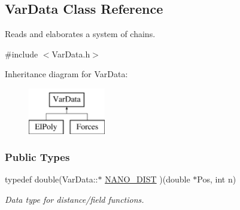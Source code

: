\hypertarget{classVarData}{\subsection{\-Var\-Data \-Class \-Reference}
\label{classVarData}
}


\-Reads and elaborates a system of chains.  




{\ttfamily \#include $<$\-Var\-Data.\-h$>$}

\-Inheritance diagram for \-Var\-Data\-:\begin{figure}[H]
\begin{center}
\leavevmode
\includegraphics[height=2.000000cm]{classVarData}
\end{center}
\end{figure}
\subsubsection*{\-Public \-Types}
\begin{DoxyCompactItemize}
\item 
\hypertarget{classVarData_aea7b2bfbbf53c129db630b86e42af630}{typedef double(\-Var\-Data\-::$\ast$ \hyperlink{classVarData_aea7b2bfbbf53c129db630b86e42af630}{\-N\-A\-N\-O\-\_\-\-D\-I\-S\-T} )(double $\ast$\-Pos, int n)}\label{classVarData_aea7b2bfbbf53c129db630b86e42af630}

\begin{DoxyCompactList}\small\item\em \-Data type for distance/field functions. \end{DoxyCompactList}\end{DoxyCompactItemize}
